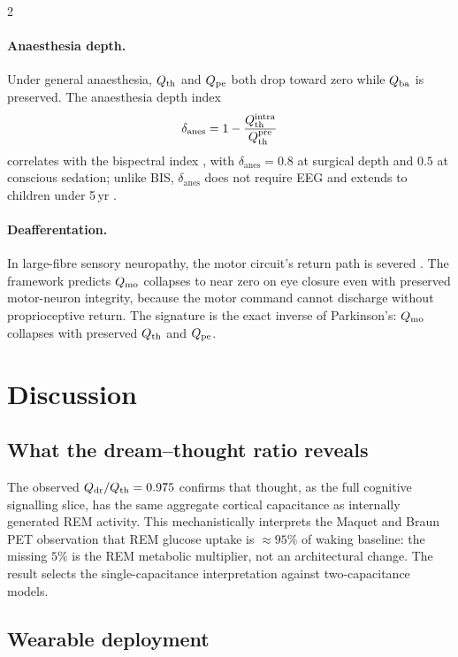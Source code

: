 \begin{multicols}{2}
\paragraph{Anaesthesia depth.}
Under general anaesthesia, $Q_{\mathrm{th}}$ and $Q_{\mathrm{pe}}$ both drop toward zero while
$Q_{\mathrm{ba}}$ is preserved.  The anaesthesia depth index
\begin{equation}
  \delta_{\mathrm{anes}} = 1 - \frac{Q_{\mathrm{th}}^{\mathrm{intra}}}{Q_{\mathrm{th}}^{\mathrm{pre}}}
  \label{eq:ch07-anes}
\end{equation}
correlates with the bispectral index \citep{kelley2003}, with
$\delta_{\mathrm{anes}} = 0.8$ at surgical depth and $0.5$ at conscious
sedation; unlike BIS, $\delta_{\mathrm{anes}}$ does not require EEG and
extends to children under 5\,yr \citep{davidson2005}.

\paragraph{Deafferentation.}
In large-fibre sensory neuropathy, the motor circuit's return path is
severed \citep{rothwell1982,cole1995}.  The framework predicts $Q_{\mathrm{mo}}$
collapses to near zero on eye closure even with preserved motor-neuron
integrity, because the motor command cannot discharge without proprioceptive
return.  The signature is the exact inverse of Parkinson's: $Q_{\mathrm{mo}}$ collapses
with preserved $Q_{\mathrm{th}}$ and $Q_{\mathrm{pe}}$.

\section{Discussion}
\label{sec:ch07-discussion}

\subsection{What the dream--thought ratio reveals}

The observed $Q_{\mathrm{dr}}/Q_{\mathrm{th}} = 0.975$ confirms that thought, as the full
cognitive signalling slice, has the same aggregate cortical capacitance as
internally generated REM activity.  This mechanistically interprets the
Maquet \citep{maquet1990} and Braun \citep{braun1997} PET observation that
REM glucose uptake is $\approx 95\%$ of waking baseline: the missing $5\%$
is the REM metabolic multiplier, not an architectural change.  The result
selects the single-capacitance interpretation against two-capacitance models.

\subsection{Wearable deployment}


\end{multicols}
